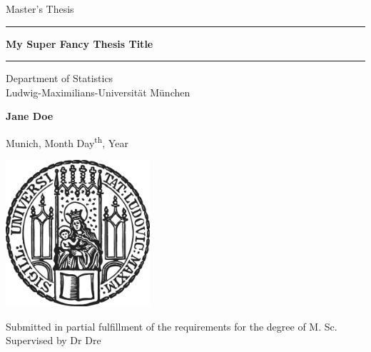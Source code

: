 \documentclass[12pt]{article}
\newcommand{\mytitle}{My Super Fancy Thesis Title}
\newcommand{\myname}{Jane Doe}
\newcommand{\mysupervisor}{Dr Dre}
\begin{document}

\begin{titlepage}
  \begin{center}

    \LARGE
    Master's Thesis

    \vspace{0.5cm}

    \rule{\textwidth}{1.5pt}
    \LARGE
    \textbf{\mytitle}
    \rule{\textwidth}{1.5pt}

    \vspace{0.5cm}

    \large
    Department of Statistics \\
    Ludwig-Maximilians-Universität München

    \vfill

    \Large
    \textbf{\myname}

    \vfill

    \large
    Munich, Month Day\textsuperscript{th}, Year

    \vfill

    \includegraphics[width = 0.4\textwidth]{sigillum.png}

    \vfill

    \normalsize
    Submitted in partial fulfillment of the requirements for the degree of M. Sc.
    \\

    Supervised by \mysupervisor

  \end{center}
\end{titlepage}


\newpage

\begin{abstract}

  This is my new abstract.

\end{abstract}
\end{document}
